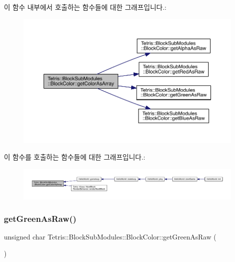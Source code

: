 이 함수 내부에서 호출하는 함수들에 대한 그래프입니다.\+:
\nopagebreak
\begin{figure}[H]
\begin{center}
\leavevmode
\includegraphics[width=350pt]{class_tetris_1_1_block_sub_modules_1_1_block_color_ac626961ee3894d89a7fc961e9f40c92f_cgraph}
\end{center}
\end{figure}
이 함수를 호출하는 함수들에 대한 그래프입니다.\+:
\nopagebreak
\begin{figure}[H]
\begin{center}
\leavevmode
\includegraphics[width=350pt]{class_tetris_1_1_block_sub_modules_1_1_block_color_ac626961ee3894d89a7fc961e9f40c92f_icgraph}
\end{center}
\end{figure}
\mbox{\label{class_tetris_1_1_block_sub_modules_1_1_block_color_a65e9230325a2f44aa433f39c199aabcd}} 
\subsubsection{\texorpdfstring{get\+Green\+As\+Raw()}{getGreenAsRaw()}}
{\footnotesize\ttfamily unsigned char Tetris\+::\+Block\+Sub\+Modules\+::\+Block\+Color\+::get\+Green\+As\+Raw (\begin{DoxyParamCaption}{ }\end{DoxyParamCaption})\hspace{0.3cm}{\ttfamily [inline]}}

